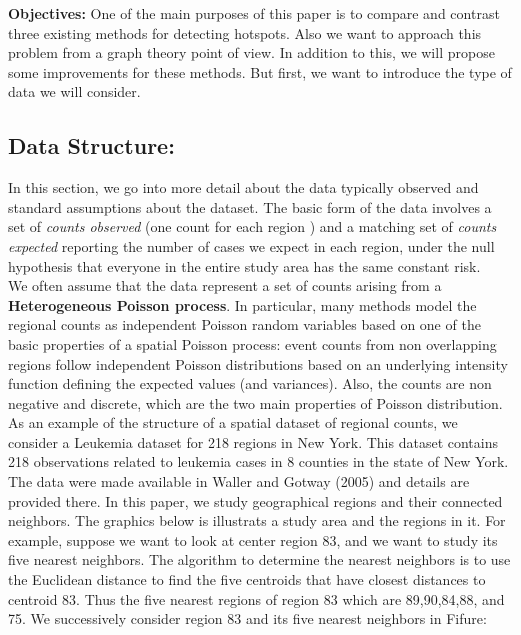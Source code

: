 \documentclass[12pt]{article}
\begin{document}
			\textbf{Objectives:} One of the main purposes of this paper is to compare and contrast three existing methods for detecting hotspots. Also we want to approach this problem from a graph theory point of view. In addition to this, we will propose some improvements for these methods. But first, we want to introduce the type of data we will consider. \\
				
		\subsection{Data Structure:} 
			In this section, we go into more detail about the data typically observed and standard assumptions about the dataset. 
			The basic form of the data involves a set of \textit{counts observed} (one count for each region ) and a matching set of \textit{counts expected} reporting the number of cases we expect in each region, under the null hypothesis that everyone in the entire study area has the same constant risk. \\
			
We often assume that the data represent a set of counts arising from a \textbf{Heterogeneous Poisson process}.
In particular, many methods model the regional counts as independent Poisson random variables based on one of the basic properties of a spatial Poisson process: event counts from non overlapping regions follow independent Poisson distributions based on an underlying intensity function defining the expected values (and variances). Also, the counts are non negative and discrete, which are the two main properties of Poisson distribution. \\
			 
			
			
			As an example of the structure of a spatial dataset of regional counts, we consider a Leukemia dataset for 218 regions in New York. This dataset contains 218 observations related to leukemia cases in 8 counties in the state of New York. The data were made available in Waller and Gotway (2005) and details are provided there. In this paper, we study geographical regions and their connected neighbors.		
The graphics below is illustrats a study area and the regions in it. For example, suppose we want to look at center region 83, and we want to study its five nearest neighbors. The algorithm to determine the nearest neighbors is to use the Euclidean distance to find the five centroids that have closest distances to centroid 83. Thus the five nearest regions of region 83 which are 89,90,84,88, and 75. We successively consider region 83 and its five nearest neighbors in Fifure: \\	
			
\end{document}
